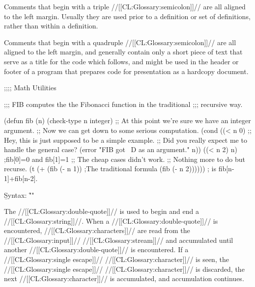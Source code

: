 Comments that begin with a triple //[[CL:Glossary:semicolon]]// are all aligned to
the left margin.  Usually they are used prior to a definition or set
of definitions, rather than within a definition.

\endsubsubsubsection%




Comments that begin with a quadruple //[[CL:Glossary:semicolon]]// are all aligned to
the left margin, and generally contain only a short piece of text that
serve as a title for the code which follows, and might be used in the
header or footer of a program that prepares code for presentation as 
a hardcopy document.

\endsubsubsubsection%


\code
;;;; Math Utilities

;;; FIB computes the the Fibonacci function in the traditional
;;; recursive way.

(defun fib (n)
  (check-type n integer)
  ;; At this point we're sure we have an integer argument.
  ;; Now we can get down to some serious computation.
  (cond ((< n 0)
         ;; Hey, this is just supposed to be a simple example.
         ;; Did you really expect me to handle the general case?
         (error "FIB got ~D as an argument." n))
        ((< n 2) n)             ;fib[0]=0 and fib[1]=1
        ;; The cheap cases didn't work.
        ;; Nothing more to do but recurse.
        (t (+ (fib (- n 1))     ;The traditional formula
              (fib (- n 2)))))) ; is fib[n-1]+fib[n-2].
\endcode

\endsubsubsubsection%

\endsubsubsection%

\endsubsection%


\b{Syntax:} \f{""}




The //[[CL:Glossary:double-quote]]// is used to begin and end a //[[CL:Glossary:string]]//.
When a //[[CL:Glossary:double-quote]]// is encountered,
//[[CL:Glossary:characters]]// are read from the //[[CL:Glossary:input]]// //[[CL:Glossary:stream]]// 
and accumulated until another //[[CL:Glossary:double-quote]]// is encountered.
If a //[[CL:Glossary:single escape]]// //[[CL:Glossary:character]]// is seen,
the //[[CL:Glossary:single escape]]// //[[CL:Glossary:character]]// is discarded,
the next //[[CL:Glossary:character]]// is accumulated, and accumulation continues.

